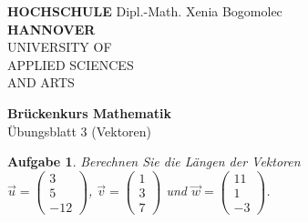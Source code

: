 \documentclass[12pt]{article}
\newtheorem{exercise}[satz]{Aufgabe}
\begin{document}
\pagestyle{empty}
\parindent 0cm
\begin{minipage}{14cm}
  \footnotesize{\textbf{HOCHSCHULE} \hfill Dipl.-Math. Xenia Bogomolec\\
  \textbf{HANNOVER}\\
   UNIVERSITY OF\\
   APPLIED SCIENCES\\
   AND ARTS
   }
\end{minipage}
\vspace{1.0cm}

\begin{center}
 {\Large \bf Br\"uckenkurs Mathematik} \\
 \vspace{0.5cm}
 {\large \"Ubungsblatt 3 (Vektoren)}  \\
\end{center}

\vspace{0.5cm}
\normalsize
\parindent0cm


\begin{exercise}
  Berechnen Sie die L\"angen der Vektoren \\
  $\vec{u}=\left(\begin{array}{r} 3 \\ 5 \\ -12 \end{array}\right)$,
  $\vec{v}=\left(\begin{array}{r} 1 \\ 3 \\ 7 \end{array}\right)$ und
  $\vec{w}=\left(\begin{array}{r} 11 \\ 1 \\ -3 \end{array}\right)$.
\end{exercise}

\vspace{0.1cm}
   
\end{document}
